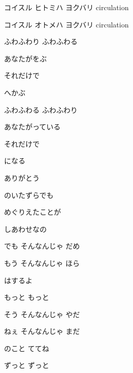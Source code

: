 \documentclass[14pt]{ltjsarticle}
\begin{document}
{  コイスル ヒトミハ ヨクバリ circulation
  \jisho{}

  コイスル オトメハ ヨクバリ circulation
  \jisho{}

\item
  ふわふわり ふわふわる
  \jisho{}

  あなたがをぶ
  \jisho{}

  それだけで
  \jisho{}

  へかぶ
  \jisho{}

\item
  ふわふわる ふわふわり
  \jisho{}

  あなたがっている
  \jisho{}

  それだけで
  \jisho{}

  になる
  \jisho{}

\item
   ありがとう
  \jisho{}

  のいたずらでも
  \jisho{}

  めぐりえたことが
  \jisho{}

  しあわせなの
  \jisho{}

\item
  でも そんなんじゃ だめ
  \jisho{}

  もう そんなんじゃ ほら
  \jisho{}

  はするよ
  \jisho{}

  もっと もっと
  \jisho{}

\item
  そう そんなんじゃ やだ
  \jisho{}

  ねぇ そんなんじゃ まだ
  \jisho{}

  のこと ててね
  \jisho{}

  ずっと ずっと
  \jisho{}

  
}
\end{document}
